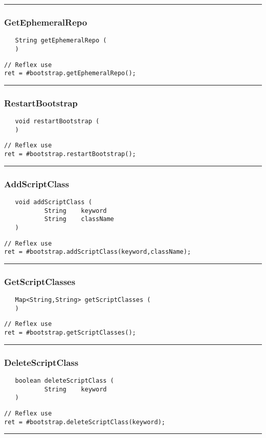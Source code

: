 \rule{15cm}{2pt}
\subsubsection{GetEphemeralRepo}
\label{Api:GetEphemeralRepo}
\begin{verbatim}
   String getEphemeralRepo (
   )
\end{verbatim}
\begin{lstlisting}[language=reflex]
// Reflex use
ret = #bootstrap.getEphemeralRepo();
\end{lstlisting}



\rule{15cm}{2pt}
\subsubsection{RestartBootstrap}
\label{Api:RestartBootstrap}
\begin{verbatim}
   void restartBootstrap (
   )
\end{verbatim}
\begin{lstlisting}[language=reflex]
// Reflex use
ret = #bootstrap.restartBootstrap();
\end{lstlisting}



\rule{15cm}{2pt}
\subsubsection{AddScriptClass}
\label{Api:AddScriptClass}
\begin{verbatim}
   void addScriptClass (
           String    keyword
           String    className
   )
\end{verbatim}
\begin{lstlisting}[language=reflex]
// Reflex use
ret = #bootstrap.addScriptClass(keyword,className);
\end{lstlisting}



\rule{15cm}{2pt}
\subsubsection{GetScriptClasses}
\label{Api:GetScriptClasses}
\begin{verbatim}
   Map<String,String> getScriptClasses (
   )
\end{verbatim}
\begin{lstlisting}[language=reflex]
// Reflex use
ret = #bootstrap.getScriptClasses();
\end{lstlisting}



\rule{15cm}{2pt}
\subsubsection{DeleteScriptClass}
\label{Api:DeleteScriptClass}
\begin{verbatim}
   boolean deleteScriptClass (
           String    keyword
   )
\end{verbatim}
\begin{lstlisting}[language=reflex]
// Reflex use
ret = #bootstrap.deleteScriptClass(keyword);
\end{lstlisting}



\rule{15cm}{2pt}
